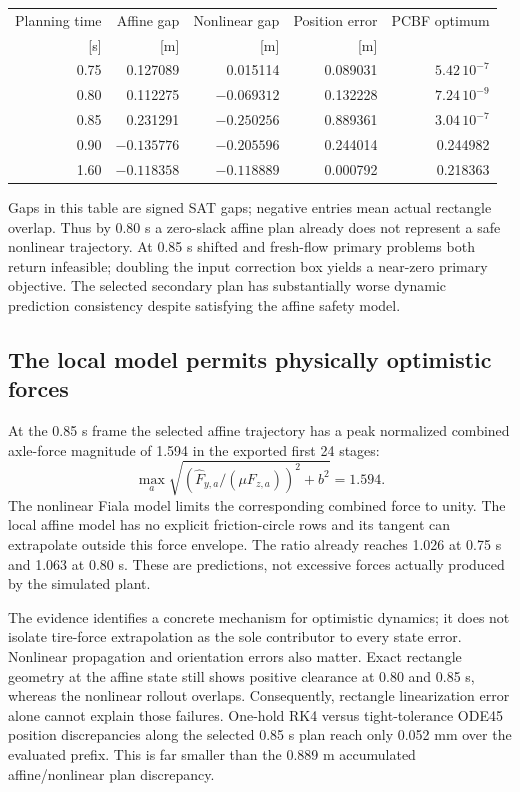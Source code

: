 \documentclass[11pt]{article}
\begin{document}
\begin{center}
\begin{tabular}{rrrrr}
\toprule
Planning time & Affine gap & Nonlinear gap & Position error & PCBF optimum\\
{[s]} & {[m]} & {[m]} & {[m]} & \\
\midrule
0.75 & 0.127089 & 0.015114 & 0.089031 & $5.42\,10^{-7}$\\
0.80 & 0.112275 & $-0.069312$ & 0.132228 & $7.24\,10^{-9}$\\
0.85 & 0.231291 & $-0.250256$ & 0.889361 & $3.04\,10^{-7}$\\
0.90 & $-0.135776$ & $-0.205596$ & 0.244014 & 0.244982\\
1.60 & $-0.118358$ & $-0.118889$ & 0.000792 & 0.218363\\
\bottomrule
\end{tabular}
\end{center}
Gaps in this table are signed SAT gaps; negative entries mean actual rectangle
overlap. Thus by 0.80 s a zero-slack affine plan already does not represent a
safe nonlinear trajectory. At 0.85 s shifted and fresh-flow primary problems
both return infeasible; doubling the input correction box yields a near-zero
primary objective. The selected secondary plan has substantially worse
dynamic prediction consistency despite satisfying the affine safety model.

\subsection{The local model permits physically optimistic forces}
At the 0.85 s frame the selected affine trajectory has a peak normalized
combined axle-force magnitude of 1.594 in the exported first 24 stages:
\[
 \max_a\sqrt{(\widehat F_{y,a}/(\mu F_{z,a}))^2+b^2}=1.594.
\]
The nonlinear Fiala model limits the corresponding combined force to unity.
The local affine model has no explicit friction-circle rows and its tangent
can extrapolate outside this force envelope. The ratio already reaches
1.026 at 0.75 s and 1.063 at 0.80 s. These are predictions, not excessive
forces actually produced by the simulated plant.

The evidence identifies a concrete mechanism for optimistic dynamics; it
does not isolate tire-force extrapolation as the sole contributor to every
state error. Nonlinear propagation and orientation errors also matter.
Exact rectangle geometry at the affine state still shows positive clearance
at 0.80 and 0.85 s, whereas the nonlinear rollout overlaps. Consequently,
rectangle linearization error alone cannot explain those failures.
One-hold RK4 versus tight-tolerance ODE45 position discrepancies along the
selected 0.85 s plan reach only 0.052 mm over the evaluated prefix. This is
far smaller than the 0.889 m accumulated affine/nonlinear plan discrepancy.
\end{document}
